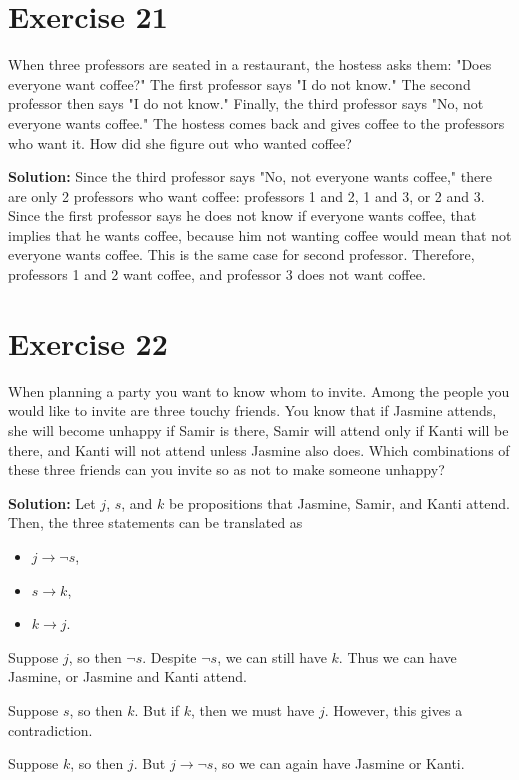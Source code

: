 \documentclass{Axon}
\begin{document}
\section*{Exercise 21}
When three professors are seated in a restaurant, the hostess asks them: "Does everyone want coffee?" The first professor says "I do not know." The second professor then says "I do not know." Finally, the third professor says "No, not everyone wants coffee." The hostess comes back and gives coffee to the professors who want it. How did she figure out who wanted coffee?

\noindent
\textbf{Solution:}
Since the third professor says "No, not everyone wants coffee," there are only 2 professors who want coffee: professors 1 and 2, 1 and 3, or 2 and 3. Since the first professor says he does not know if everyone wants coffee, that implies that he wants coffee, because him not wanting coffee would mean that not everyone wants coffee. This is the same case for second professor. Therefore, professors 1 and 2 want coffee, and professor 3 does not want coffee.

\section*{Exercise 22}
When planning a party you want to know whom to invite. Among the people you would like to invite are three touchy friends. You know that if Jasmine attends, she will become unhappy if Samir is there, Samir will attend only if Kanti will be there, and Kanti will not attend unless Jasmine also does. Which combinations of these three friends can you invite so as not to make someone unhappy?

\noindent
\textbf{Solution:}
Let \(j\), \(s\), and \(k\) be propositions that Jasmine, Samir, and Kanti attend. Then, the three statements can be translated as
\begin{itemize}
    \item \(j \to \lnot s\),
    \item \(s \to k\),
    \item \(k \to j\).
\end{itemize}

Suppose \(j\), so then \(\lnot s\). Despite \(\lnot s\), we can still have \(k\). Thus we can have Jasmine, or Jasmine and Kanti attend.

Suppose \(s\), so then \(k\). But if \(k\), then we must have \(j\). However, this gives a contradiction.

Suppose \(k\), so then \(j\). But \(j \to \lnot s\), so we can again have Jasmine or Kanti.
\end{document}

